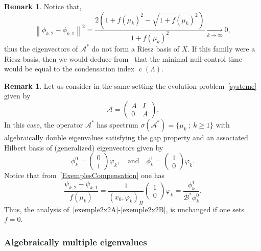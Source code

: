 \documentclass[10pt]{amsart}
\theoremstyle{definition}\newtheorem{defi}[theo]{Definition}\newtheorem{rema}[theo]{Remark}\newtheorem{exam}[theo]{Example}\newtheorem{exem}[theo]{Example}\newtheorem{nota}[theo]{Notation}
\newcommand\A{\mathcal{A}}
\newcommand\As{\mathcal{A}^*}
\newcommand\Bs{\mathcal{B}^*}
\newcommand{\normeX}[1]{\left\| #1 \right\|}
\newcommand{\psH}[2]{\left(#1, #2 \right)_H}
\DeclareMathOperator{\cond}{c}
\begin{document}
\begin{rema}
Notice that,
\begin{equation*}\label{ExAcademique1:EstimeeDifferenceVectProp}
\normeX{ \phi_{k,2} - \phi_{k,1} }^2 = \frac{2 \left(1+ f(\mu_k)^2 - \sqrt{1+f(\mu_k)^2} \right)}{1+ f(\mu_k)^2} \underset{k \to \infty}{\longrightarrow} 0,
\end{equation*}
thus the eigenvectors of $\As$ do not form a Riesz basis of $X$. If this family were a Riesz basis, then we would deduce from~\cite{AmmarKhodjaBenabdallahGonzalez-BurgosdeTeresa:2014} that the minimal null-control time would be equal to the condensation index $\cond(\Lambda)$.
\end{rema}

\begin{rema} \label{Rem:SystLimite}
Let us consider in the same setting the evolution problem~\eqref{systeme} given by
\begin{equation*}\label{exempleA}
\A=
\begin{pmatrix} A & I \\ 0 & A
\end{pmatrix}.
\end{equation*}
In this case, the operator $\As$ has spectrum $ \sigma(\As)=\{ \mu_k \: ; \: k \geq 1\}$ with algebraically double eigenvalues satisfying the gap property and an associated Hilbert basis of (generalized) eigenvectors given by
\[
\phi_k^0=
\begin{pmatrix} 0 \\ 1
\end{pmatrix} \varphi_k,
\quad \text{and} \quad
\phi_k^1=
\begin{pmatrix} 1 \\ 0
\end{pmatrix} \varphi_k.
\]
Notice that from~\eqref{ExemplesCompensation} one has
\[
\frac{\psi_{k,2}- \psi_{k,1}}{f(\mu_k)} = \frac{1}{\psH{x_0}{\varphi_k}}
\begin{pmatrix} 1 \\ 0
\end{pmatrix} \varphi_k = \frac{\phi_k^1}{\Bs \phi_k^0}.
\]
Thus, the analysis of~\eqref{exemple2x2A}-\eqref{exemple2x2B}, is unchanged if one sets $f=0$.
\end{rema}



\subsubsection{Algebraically multiple eigenvalues}\label{secexample3x2+1}
\end{document}
